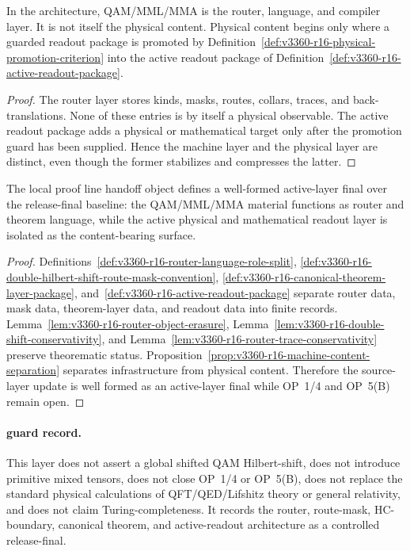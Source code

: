 \begin{proposition}
\label{prop:v3360-r16-machine-content-separation}
In the architecture, QAM/MML/MMA is the router, language, and compiler layer. It is not itself the physical content. Physical content begins only where a guarded readout package is promoted by Definition~\ref{def:v3360-r16-physical-promotion-criterion} into the active readout package of Definition~\ref{def:v3360-r16-active-readout-package}.
\end{proposition}

\begin{proof}
The router layer stores kinds, masks, routes, collars, traces, and back-translations. None of these entries is by itself a physical observable. The active readout package adds a physical or mathematical target only after the promotion guard has been supplied. Hence the machine layer and the physical layer are distinct, even though the former stabilizes and compresses the latter.
\end{proof}

\begin{theorem}
\label{thm:v3360-r16-active-layer-handoff}
The local proof line handoff object defines a well-formed active-layer final over the  release-final baseline: the QAM/MML/MMA material functions as router and theorem language, while the active physical and mathematical readout layer is isolated as the content-bearing surface.
\end{theorem}

\begin{proof}
Definitions~\ref{def:v3360-r16-router-language-role-split}, \ref{def:v3360-r16-double-hilbert-shift-route-mask-convention}, \ref{def:v3360-r16-canonical-theorem-layer-package}, and~\ref{def:v3360-r16-active-readout-package} separate router data, mask data, theorem-layer data, and readout data into finite records. Lemma~\ref{lem:v3360-r16-router-object-erasure}, Lemma~\ref{lem:v3360-r16-double-shift-conservativity}, and Lemma~\ref{lem:v3360-r16-router-trace-conservativity} preserve theorematic status. Proposition~\ref{prop:v3360-r16-machine-content-separation} separates infrastructure from physical content. Therefore the source-layer update is well formed as an active-layer final while OP~1/4 and OP~5(B) remain open.
\end{proof}

\paragraph{guard record.}
This layer does not assert a global shifted QAM Hilbert-shift, does not introduce primitive mixed tensors, does not close OP~1/4 or OP~5(B), does not replace the standard physical calculations of QFT/QED/Lifshitz theory or general relativity, and does not claim Turing-completeness. It records the router, route-mask, HC-boundary, canonical theorem, and active-readout architecture as a controlled release-final.


